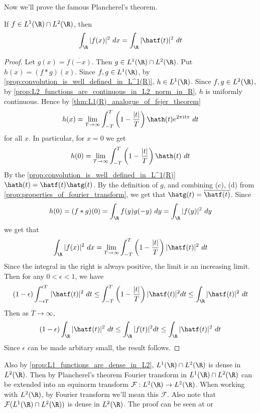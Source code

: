 Now we'll prove the famous Plancherel's theorem.
\begin{theorem}
  \label{thm:Plancherel's_theorem}
  If $f \in L^1(\R) \cap L^2(\R)$, then $$\int_\R |f(x)|^2 \ dx = \int_\R |\hatf(t)|^2 \ dt $$
\end{theorem}
\begin{proof}
  Let $g(x) = \overline{f(-x)}$. Then $g \in L^1(\R)\cap L^2(\R)$. Put $h(x) = (f*g)(x)$. Since $f, g \in L^1(\R)$, by \autoref{prop:convolution_is_well_defined_in_L^1(R)}, $h \in L^1(\R)$. Since $f, g \in L^2(\R)$, by \autoref{prop:L2_functions_are_continuous_in_L2_norm_in_R}, $h$ is uniformly continuous. 
  Hence by \autoref{thm:L1(R)_analogue_of_fejer_theorem}  $$h(x) = \lim_{T\to \infty} \int_{-T}^T \left(1-\frac{|t|}{T}\right) \hath(t)e^{2\pi itx} \ dt $$ for all $x$. In particular, for $x=0$ we get $$h(0) = \lim_{T\to \infty} \int_{-T}^T \left(1-\frac{|t|}{T}\right) \hath(t) \ dt$$
  By the \autoref{prop:convolution_is_well_defined_in_L^1(R)} $\hath(t) = \hatf(t)\hatg(t)$. By the definition of $g$, and combining (c), (d) from \autoref{prop:properties_of_fourier_transform}, we get that $\hatg(t) = \overline{\hatf(t)}$.
  Since $$h(0) = (f*g)(0) = \int_\R f(y)g(-y) \ dy = \int_\R |f(y)|^2 \ dy$$
  we get that $$\int_\R |f(x)|^2 \ dx = \lim_{T\to \infty} \int_{-T}^T \left(1-\frac{|t|}{T}\right) |\hatf(t)|^2 \ dt$$
  Since the integral in the right is always positive, the limit is an increasing limit. Then for any $0<\epsilon<1$, we have $$(1-\epsilon) \int_{-\epsilon T}^{\epsilon T} |\hatf(t)|^2 \ dt \le \int_{-T}^{T} \left( 1-\frac{|t|}{T} \right) |\hatf(t)|^2 dt \le \int_\R |\hatf(t)|^2 \ dt$$
  Then as $T \to \infty$, $$(1-\epsilon) \int_\R |\hatf(t)|^2 \ dt \le \int_{\R} |f(t)|^2 dt \le \int_\R |\hatf(t)|^2 \ dt$$
  Since $\epsilon$ can be made arbitary small, the result follows.
\end{proof}

Also by \autoref{prop:L1_functions_are_dense_in_L2}, $L^1(\R) \cap L^2(\R)$ is dense in $L^2(\R)$. Then by Plancherel's theorem Fourier transform in $L^1(\R) \cap L^2(\R)$ can be extended into an equinorm transform $\mathcal{F} : L^2(\R) \to L^2(\R)$. When working with $L^2(\R)$, by Fourier transform we'll mean this $\mathcal{F}$. Also note that $\mathcal{F}(L^1(\R) \cap L^2(\R))$ is dense in $L^2(\R)$. The proof can be seen at \autocite[Theorem~9.13 \pno~186]{papaRudin} or \autocite[Theorem~2.4.1 \pno~128]{PinskyWavelet}



